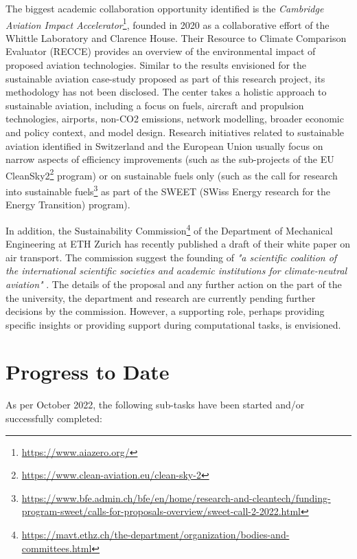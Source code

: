 \documentclass{article}
\begin{document}
	The biggest academic collaboration opportunity identified is the \textit{Cambridge Aviation Impact Accelerator}\footnote{\url{https://www.aiazero.org/}}, founded in 2020 as a collaborative effort of the Whittle Laboratory and Clarence House. Their Resource to Climate Comparison Evaluator (RECCE) \cite{noauthor_recce_2022} provides an overview of the environmental impact of proposed aviation technologies. Similar to the results envisioned for the sustainable aviation case-study proposed as part of this research project, its methodology has not been disclosed. The center takes a holistic approach to sustainable aviation, including a focus on fuels, aircraft and propulsion technologies, airports, non-CO2 emissions, network modelling, broader economic and policy context, and model design. Research initiatives related to sustainable aviation identified in Switzerland and the European Union usually focus on narrow aspects of efficiency improvements (such as the sub-projects of the EU CleanSky2\footnote{\url{https://www.clean-aviation.eu/clean-sky-2}} program) or on sustainable fuels only (such as the call for research into sustainable fuels\footnote{\url{https://www.bfe.admin.ch/bfe/en/home/research-and-cleantech/funding-program-sweet/calls-for-proposals-overview/sweet-call-2-2022.html}} as part of the SWEET (SWiss Energy research for the Energy Transition) program).
    
    In addition, the Sustainability Commission\footnote{\url{https://mavt.ethz.ch/the-department/organization/bodies-and-committees.html}} of the Department of Mechanical Engineering at ETH Zurich has recently published a draft of their white paper on air transport. The commission suggest the founding of  \textit{"a scientific coalition of the international scientific societies and academic institutions for climate-neutral aviation"} \cite{mazzotti_air_2022}. The details of the proposal and any further action on the part of the the university, the department and research are currently pending further decisions by the commission. However, a supporting role, perhaps providing specific insights or providing support during computational tasks, is envisioned.

\section{Progress to Date}

    As per October 2022, the following sub-tasks have been started and/or successfully completed:
    
\end{document}
